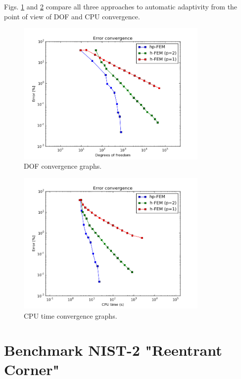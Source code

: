 \documentclass[12pt]{elsarticle}
\begin{document}
Figs. \ref{fig:nist-1-conv-dof} and \ref{fig:nist-1-conv-cpu} compare all
three approaches to automatic adaptivity from the point
of view of DOF and CPU convergence.

\begin{figure}[!ht]
\centering
\vspace{-3mm}
\includegraphics[height=7cm]{nist/nist-1/conv_dof_aniso.png}
\vspace{-3mm}
\caption{DOF convergence graphs. }
\label{fig:nist-1-conv-dof}
\end{figure}

\begin{figure}[!ht]
\centering
\vspace{-3mm}
\includegraphics[height=7cm]{nist/nist-1/conv_cpu_aniso.png}
\vspace{-3mm}
\caption{CPU time convergence graphs.}
\label{fig:nist-1-conv-cpu}
\end{figure}


\section{Benchmark NIST-2 "Reentrant Corner"}
\label{sec:bench-2}
\end{document}
